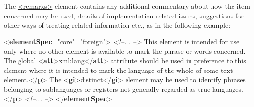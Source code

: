 The \hyperref[TEI.remarks]{<remarks>} element contains any additional commentary about how the item concerned may be used, details of implementation-related issues, suggestions for other ways of treating related information etc., as in the following example: \par\bgroup{}\exampleFont \begin{shaded}\noindent\mbox{}{<\textbf{elementSpec}\hspace*{1em}{module}="{core}"\hspace*{1em}{ident}="{foreign}">}\mbox{}\newline 
\textit{<!--... -->}\mbox{}\newline 
{}\mbox{}\newline 
\hspace*{1em}This element is intended for use only where no other element is available to mark the phrase\mbox{}\newline 
\hspace*{1em}\hspace*{1em}\hspace*{1em}\hspace*{1em} or words concerned. The global {<\textbf{att}>}xml:lang{</\textbf{att}>} attribute should be used in preference to\mbox{}\newline 
\hspace*{1em}\hspace*{1em}\hspace*{1em}\hspace*{1em} this element where it is intended to mark the language of the whole of some text element.{</\textbf{p}>}\mbox{}\newline 
\hspace*{1em}The {<\textbf{gi}>}distinct{</\textbf{gi}>} element may be used to identify phrases belonging to sublanguages or\mbox{}\newline 
\hspace*{1em}\hspace*{1em}\hspace*{1em}\hspace*{1em} registers not generally regarded as true languages.{</\textbf{p}>}\mbox{}\newline 
{}\mbox{}\newline 
\textit{<!--... -->}\mbox{}\newline 
{</\textbf{elementSpec}>}\end{shaded}\egroup\par \par
